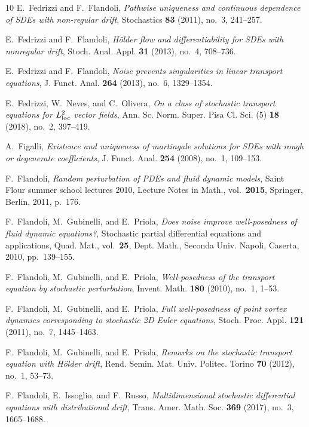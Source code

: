 \documentclass[a4paper,10pt]{article}
\newcommand\1{\mathbbm{1}}
\numberwithin{equation}{section}
\begin{document}
\begin{thebibliography}{10}
E.~Fedrizzi and F.~Flandoli, \emph{Pathwise uniqueness and continuous
  dependence of {SDE}s with non-regular drift}, Stochastics \textbf{83}
  (2011), no.~3, 241--257.

E.~Fedrizzi and F.~Flandoli, \emph{H\"{o}lder flow and differentiability for {SDE}s with nonregular drift}, Stoch. Anal. Appl. \textbf{31} (2013), no.~4, 708--736.

E.~Fedrizzi and F.~Flandoli, \emph{Noise prevents singularities in linear transport equations}, J. Funct. Anal. \textbf{264} (2013), no.~6, 1329--1354.

E.~Fedrizzi, W.~Neves, and C.~Olivera, \emph{On a class of stochastic transport equations for {$L^2_{\rm loc}$} vector fields}, Ann. Sc. Norm. Super. Pisa Cl. Sci. (5) \textbf{18} (2018), no.~2, 397--419.

A.~Figalli, \emph{Existence and uniqueness of martingale solutions for {SDE}s with rough or degenerate coefficients}, J. Funct. Anal. \textbf{254}
  (2008), no.~1, 109--153.

F.~Flandoli, \emph{Random perturbation of {PDE}s and fluid dynamic models},
  Saint Flour summer school lectures 2010, Lecture Notes in Math.,
  vol.~\textbf{2015}, Springer, Berlin, 2011, p.~176.

F.~Flandoli, M.~Gubinelli, and E.~Priola, \emph{Does noise improve
  well-posedness of fluid dynamic equations?}, Stochastic partial differential equations and applications, Quad. Mat., vol.~\textbf{25}, Dept. Math., Seconda
  Univ. Napoli, Caserta, 2010, pp.~139--155.

F.~Flandoli, M.~Gubinelli, and E.~Priola, \emph{Well-posedness of the transport equation by stochastic perturbation}, Invent. Math. \textbf{180} (2010), no.~1, 1--53.

F.~Flandoli, M.~Gubinelli, and E.~Priola, \emph{{Full well-posedness of point vortex dynamics corresponding to stochastic 2D Euler equations}}, Stoch. Proc. Appl. \textbf{{\bf121}} (2011),
  no.~7, 1445--1463.

F.~Flandoli, M.~Gubinelli, and E.~Priola, \emph{Remarks on the stochastic transport equation with {H}\"{o}lder drift}, Rend. Semin. Mat. Univ. Politec. Torino \textbf{70} (2012),
  no.~1, 53--73.

F.~Flandoli, E.~Issoglio, and F.~Russo, \emph{Multidimensional stochastic
  differential equations with distributional drift}, Trans. Amer. Math. Soc.
  \textbf{369} (2017), no.~3, 1665--1688.


\end{thebibliography}
\end{document}
